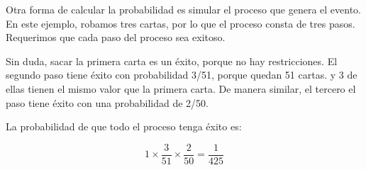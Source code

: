 Otra forma de calcular la probabilidad es simular el proceso que genera el evento. En este ejemplo, robamos tres cartas, por lo que el proceso consta de tres pasos. Requerimos que cada paso del proceso sea exitoso.

Sin duda, sacar la primera carta es un éxito, porque no hay restricciones. El segundo paso tiene éxito con probabilidad 3/51, porque quedan 51 cartas. y 3 de ellas tienen el mismo valor que la primera carta. De manera similar, el tercero el paso tiene éxito con una probabilidad de 2/50.

La probabilidad de que todo el proceso tenga éxito es:

$$1 \times \dfrac{3}{51} \times \dfrac{2}{50} = \dfrac{1}{425} $$